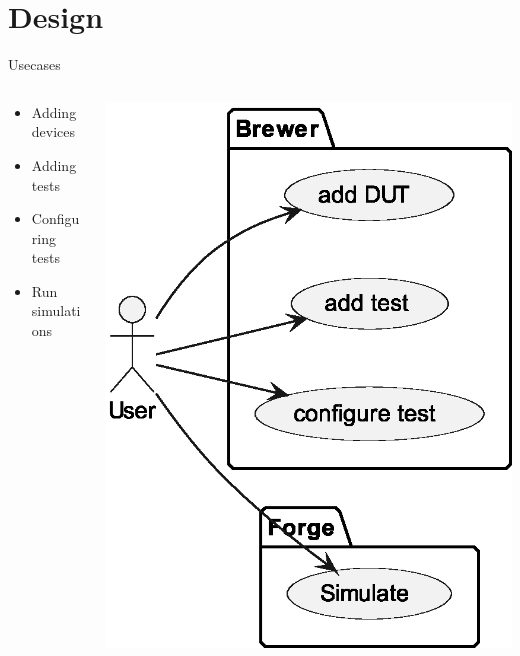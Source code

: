 \documentclass[aspectratio=169, handout]{beamer}
\begin{document}
\section{Design}
\begin{frame}{Usecases}
    \begin{columns}
        \begin{column}{.45\textwidth}
            \begin{itemize}
                \item Adding devices
                \item Adding tests
                \item Configuring tests
                \item Run simulations
            \end{itemize}
        \end{column}
        \begin{column}{.45\textwidth}
            \includegraphics[width=.8\columnwidth]{out/plantuml/usecase2/usecase2.eps}
        \end{column}
    \end{columns}
\end{frame}
\end{document}
